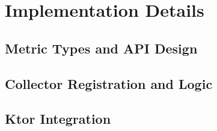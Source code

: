 \chapter{Implementation Details} \label{cap:implementation}


\section{Metric Types and API Design}
\lipsum[1]


\section{Collector Registration and Logic}
\lipsum[1]


\section{Ktor Integration}
\lipsum[1]

